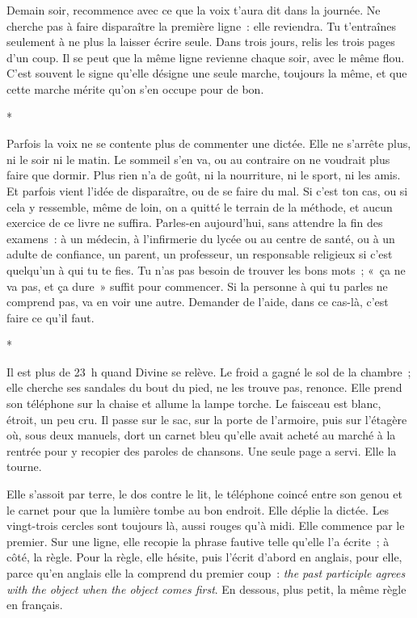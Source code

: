 \documentclass[10.5pt,twoside,openright]{book}
\newcommand{\asterisme}{\par\vspace{0.7em}\centerline{\color{gris}*\quad*\quad*}\vspace{0.7em}\par\noindent}
\begin{document}
Demain soir, recommence avec ce que la voix t’aura dit dans la journée. Ne cherche pas à faire disparaître la première ligne : elle reviendra. Tu t’entraînes seulement à ne plus la laisser écrire seule. Dans trois jours, relis les trois pages d’un coup. Il se peut que la même ligne revienne chaque soir, avec le même flou. C’est souvent le signe qu’elle désigne une seule marche, toujours la même, et que cette marche mérite qu’on s’en occupe pour de bon.

\asterisme

Parfois la voix ne se contente plus de commenter une dictée. Elle ne s’arrête plus, ni le soir ni le matin. Le sommeil s’en va, ou au contraire on ne voudrait plus faire que dormir. Plus rien n’a de goût, ni la nourriture, ni le sport, ni les amis. Et parfois vient l’idée de disparaître, ou de se faire du mal. Si c’est ton cas, ou si cela y ressemble, même de loin, on a quitté le terrain de la méthode, et aucun exercice de ce livre ne suffira. Parles-en aujourd’hui, sans attendre la fin des examens : à un médecin, à l’infirmerie du lycée ou au centre de santé, ou à un adulte de confiance, un parent, un professeur, un responsable religieux si c’est quelqu’un à qui tu te fies. Tu n’as pas besoin de trouver les bons mots ; « ça ne va pas, et ça dure » suffit pour commencer. Si la personne à qui tu parles ne comprend pas, va en voir une autre. Demander de l’aide, dans ce cas-là, c’est faire ce qu’il faut.

\asterisme

Il est plus de 23 h quand Divine se relève. Le froid a gagné le sol de la chambre ; elle cherche ses sandales du bout du pied, ne les trouve pas, renonce. Elle prend son téléphone sur la chaise et allume la lampe torche. Le faisceau est blanc, étroit, un peu cru. Il passe sur le sac, sur la porte de l’armoire, puis sur l’étagère où, sous deux manuels, dort un carnet bleu qu’elle avait acheté au marché à la rentrée pour y recopier des paroles de chansons. Une seule page a servi. Elle la tourne.

Elle s’assoit par terre, le dos contre le lit, le téléphone coincé entre son genou et le carnet pour que la lumière tombe au bon endroit. Elle déplie la dictée. Les vingt-trois cercles sont toujours là, aussi rouges qu’à midi. Elle commence par le premier. Sur une ligne, elle recopie la phrase fautive telle qu’elle l’a écrite ; à côté, la règle. Pour la règle, elle hésite, puis l’écrit d’abord en anglais, pour elle, parce qu’en anglais elle la comprend du premier coup : \emph{the past participle agrees with the object when the object comes first}. En dessous, plus petit, la même règle en français.
\end{document}
